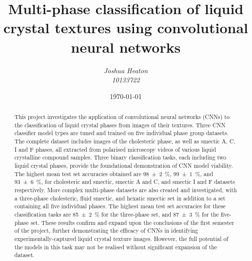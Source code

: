 \documentclass[12pt]{article}
\newcommand{\p}[2]{\SI[separate-uncertainty = true]{#1 \pm #2}{\percent}}
\begin{document}
\title{Multi-phase classification of liquid crystal textures using convolutional neural networks}
\author{\textit{Joshua Heaton}\\\textit{10133722}}
\date{\today}

\maketitle

\begin{abstract}
This project investigates the application of convolutional neural networks (CNNs) to the classification of liquid crystal phases from images of their textures. Three CNN classifier model types are tuned and trained on five individual phase group datasets. The complete dataset includes images of the cholesteric phase, as well as smectic A, C, I and F phases, all extracted from polarised microscopy videos of various liquid crystalline compound samples. Three binary classification tasks, each including two liquid crystal phases, provide the foundational demonstration of CNN model viability. The highest mean test set accuracies obtained are \p{98}{2}, \p{99}{1}, and \p{93}{6}, for cholesteric and smectic, smectic A and C, and smectic I and F datasets respectively. More complex multi-phase datasets are also created and investigated, with a three-phase cholesteric, fluid smectic, and hexatic smectic set in addition to a set containing all five individual phases. The highest mean test set accuracies for these classification tasks are \p{85}{2} for the three-phase set, and \p{87}{3} for the five-phase set. These results confirm and expand upon the conclusions of the first semester of the project, further demonstrating the efficacy of CNNs in identifying experimentally-captured liquid crystal texture images. However, the full potential of the models in this task may not be realised without significant expansion of the dataset.
\end{abstract}

\newpage
\tableofcontents

\newpage
{}
\end{document}
